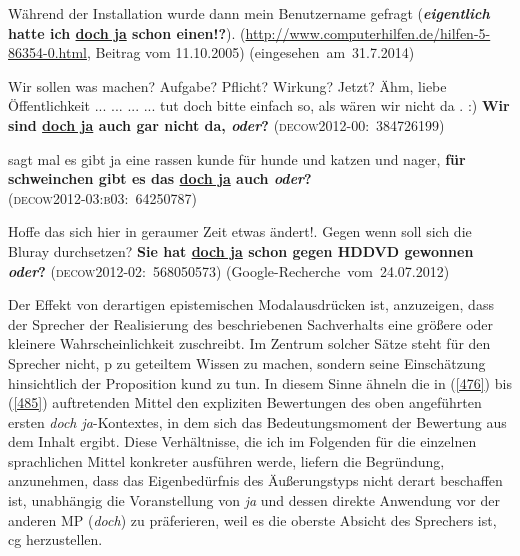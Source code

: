 \begin{exe}
	\ex\label{482} 
\begin{sloppypar}
	Während der Installation wurde dann mein Benutzername gefragt (\textbf{\textit{eigentlich} hatte ich \underline{doch ja} schon einen!?}).
	{\scriptsize(\url{http://www.computerhilfen.de/hilfen-5-86354-0.html}, Beitrag vom 11.10.2005)}
	\hfill\hbox{(eingesehen am 31.7.2014)}	
\end{sloppypar}
\end{exe} 		
	
\begin{exe}
	\ex\label{483} 

	Wir sollen was machen? Aufgabe? Pflicht? Wirkung? Jetzt? Ähm, liebe Öffentlichkeit ... ... ... ... tut doch bitte einfach so, als wären wir nicht da . :) \textbf{Wir sind \underline{doch ja} auch gar nicht da, \textit{oder}?}
	\hfill\hbox{\scshape(decow2012-00: 384726199)}	
\end{exe} 		
				        		                        
\begin{exe}
	\ex\label{484} 

	sagt mal es gibt ja eine rassen kunde für hunde und katzen und nager, \textbf{für schweinchen gibt es das \underline{doch ja} auch \textit{oder}?}\\
	\hbox{}\hfill\hbox{\scshape(decow2012-03:b03: 64250787)}	
\end{exe} 									                        
 
\begin{exe}
	\ex\label{485} 

	Hoffe das sich hier in geraumer Zeit etwas ändert!. Gegen wenn soll sich die Bluray durchsetzen? \textbf{Sie hat \underline{doch ja} schon gegen HDDVD 	gewonnen \textit{oder}?}    
	\hfill\hbox{\scshape(decow2012-02: 568050573)}	
	\newline		
	\hbox{}\hfill\hbox{(Google-Recherche vom 24.07.2012)}	
	\newline		
	\hbox{}\hfill\hbox{\citet[228]{Mueller2017b}}	
\end{exe} 									   		                 
Der Effekt von derartigen epistemischen Modalausdrücken ist, anzuzeigen, dass der Sprecher der Realisierung des beschriebenen Sachverhalts eine größere oder kleinere Wahrscheinlichkeit zuschreibt. Im Zentrum solcher Sätze steht für den Sprecher nicht, p zu geteiltem Wissen zu machen, sondern seine Einschätzung hinsichtlich der Proposition kund zu tun. In diesem Sinne ähneln die in (\ref{476}) bis (\ref{485}) auftretenden Mittel den expliziten Bewertungen des oben angeführten ersten \textit{doch ja}-Kontextes, in dem sich das Bedeutungsmoment der Bewertung aus dem Inhalt ergibt. Diese Verhältnisse, die ich im Folgenden für die einzelnen sprachlichen Mittel konkreter ausführen werde, liefern die Begründung, anzunehmen, dass das Eigenbedürfnis des Äußerungstyps nicht derart beschaffen ist, unabhängig die Voranstellung von \textit{ja} und dessen direkte Anwendung vor der anderen MP (\textit{doch}) zu präferieren, weil es die oberste Absicht des Sprechers ist, cg herzustellen.

